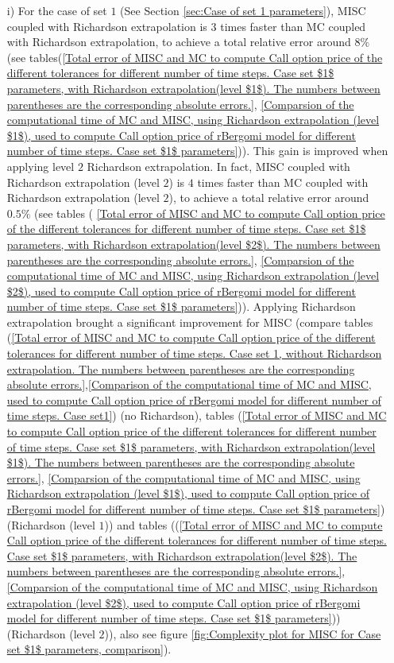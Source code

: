 	\begin{enumerate}
		
		
		\item [i)] For the case of set $1$ (See Section \ref{sec:Case of set 1 parameters}), MISC coupled with Richardson extrapolation  is $3$ times faster than MC coupled with Richardson extrapolation, to achieve a total relative error around $8\%$  (see  tables(\ref{Total  error of MISC and MC to compute Call option price of the different tolerances for different number of time steps. Case set $1$ parameters, with Richardson extrapolation(level $1$). The numbers between parentheses are the corresponding absolute errors.}, \ref{Comparsion of the computational time of  MC and MISC, using Richardson extrapolation (level $1$), used to compute Call option price of rBergomi model for different number of time steps. Case set $1$ parameters})). This gain is improved when applying level $2$ Richardson extrapolation. In fact,  MISC coupled with Richardson extrapolation (level $2$) is $4$ times faster than MC coupled with Richardson extrapolation (level $2$), to achieve a total relative error around $0.5\%$ (see  tables  ( \ref{Total  error of MISC and MC to compute Call option price of the different tolerances for different number of time steps. Case set $1$ parameters, with Richardson extrapolation(level $2$). The numbers between parentheses are the corresponding absolute errors.}, \ref{Comparsion of the computational time of  MC and MISC, using Richardson extrapolation (level $2$), used to compute Call option price of rBergomi model for different number of time steps. Case set $1$ parameters})).  Applying Richardson extrapolation brought a significant improvement for MISC (compare tables (\ref{Total error of MISC and MC to compute Call option price of the different tolerances for different number of time steps. Case set 1, without Richardson extrapolation. The numbers between parentheses are the corresponding absolute errors.},\ref{Comparison of the computational time of  MC and MISC, used to compute Call option price of rBergomi model for different number of time steps. Case set1}) (no Richardson), tables (\ref{Total  error of MISC and MC to compute Call option price of the different tolerances for different number of time steps. Case set $1$ parameters, with Richardson extrapolation(level $1$). The numbers between parentheses are the corresponding absolute errors.}, \ref{Comparsion of the computational time of  MC and MISC, using Richardson extrapolation (level $1$), used to compute Call option price of rBergomi model for different number of time steps. Case set $1$ parameters}) (Richardson (level $1$)) and  tables ((\ref{Total  error of MISC and MC to compute Call option price of the different tolerances for different number of time steps. Case set $1$ parameters, with Richardson extrapolation(level $2$). The numbers between parentheses are the corresponding absolute errors.}, \ref{Comparsion of the computational time of  MC and MISC, using Richardson extrapolation (level $2$), used to compute Call option price of rBergomi model for different number of time steps. Case set $1$ parameters})) (Richardson (level $2$)), also see  figure \ref{fig:Complexity plot for  MISC for Case set $1$ parameters, comparison}).
		

\end{enumerate}
